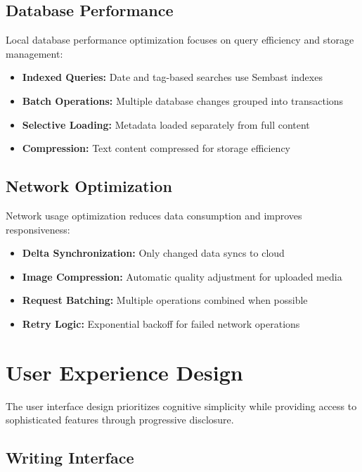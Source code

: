 \documentclass[conference]{IEEEtran}
\begin{document}
\subsection{Database Performance}

Local database performance optimization focuses on query efficiency and storage management:

\begin{itemize}
\item \textbf{Indexed Queries:} Date and tag-based searches use Sembast indexes
\item \textbf{Batch Operations:} Multiple database changes grouped into transactions
\item \textbf{Selective Loading:} Metadata loaded separately from full content
\item \textbf{Compression:} Text content compressed for storage efficiency
\end{itemize}

\subsection{Network Optimization}

Network usage optimization reduces data consumption and improves responsiveness:

\begin{itemize}
\item \textbf{Delta Synchronization:} Only changed data syncs to cloud
\item \textbf{Image Compression:} Automatic quality adjustment for uploaded media
\item \textbf{Request Batching:} Multiple operations combined when possible
\item \textbf{Retry Logic:} Exponential backoff for failed network operations
\end{itemize}

\section{User Experience Design}

The user interface design prioritizes cognitive simplicity while providing access to sophisticated features through progressive disclosure.

\subsection{Writing Interface}
\end{document}
